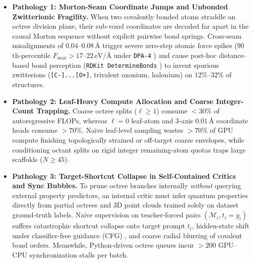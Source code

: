 \documentclass[11pt,a4paper]{article}
\begin{document}
\begin{itemize}[leftmargin=1.5em,itemsep=2pt,topsep=3pt]
    \item \textbf{Pathology 1: Morton-Seam Coordinate Jumps and Unbonded Zwitterionic Fragility.} When two covalently bonded atoms straddle an octree division plane, their sub-voxel coordinates are decoded far apart in the causal Morton sequence without explicit pairwise bond springs. Cross-seam misalignments of $0.04\text{--}0.08\,\text{\AA}$ trigger severe zero-step atomic force spikes ($90$th-percentile $F_{\max} > 17\text{--}22\,\text{eV/\AA}$ under \texttt{DPA-4} \citep{deepmodeling2026dpa4}) and cause post-hoc distance-based bond perception (\texttt{RDKit DetermineBonds} \citep{rdkit2026bonds}) to invent spurious zwitterions (\texttt{[C-]...[O+]}, trivalent oxonium, halonium) on $12\%\text{--}32\%$ of structures.
    \item \textbf{Pathology 2: Leaf-Heavy Compute Allocation and Coarse Integer-Count Trapping.} Coarse octree splits ($\ell \ge 1$) consume $<30\%$ of autoregressive FLOPs, whereas $\ell = 0$ leaf-atom and $3$-axis $0.01\,\text{\AA}$ coordinate heads consume $>70\%$. Naive leaf-level sampling wastes $>70\%$ of GPU compute finishing topologically strained or off-target coarse envelopes, while conditioning octant splits on rigid integer remaining-atom quotas traps large scaffolds ($N \ge 45$).
    \item \textbf{Pathology 3: Target-Shortcut Collapse in Self-Contained Critics and Sync Bubbles.} To prune octree branches internally \emph{without} querying external property predictors, an internal critic must infer quantum properties directly from partial octrees and 3D point clouds trained solely on dataset ground-truth labels. Naive supervision on teacher-forced pairs $(\mathcal{M}_i, t_i = y_i)$ suffers catastrophic shortcut collapse onto target prompt $t_i$, hidden-state shift under classifier-free guidance (CFG) \citep{ho2022cfg}, and coarse radial blurring of covalent bond orders. Meanwhile, Python-driven octree queues incur $>200$ GPU--CPU synchronization stalls per batch.
\end{itemize}
\end{document}
